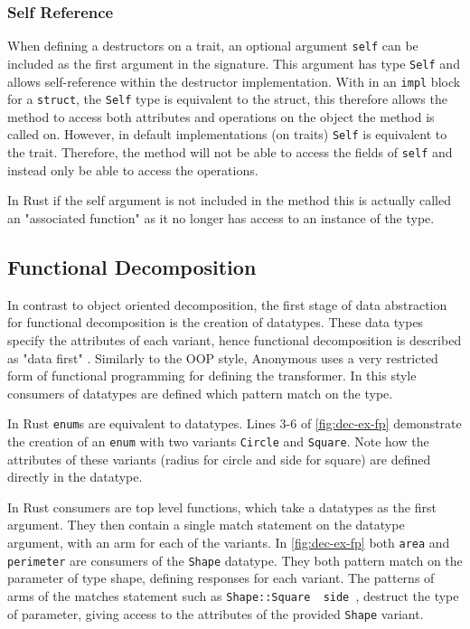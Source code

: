 \documentclass[ oneside,%
                    author={James Elgar},
                    degree={MEng},
                     title={Bidirectional transformer between functional and \\ object-oriented programming in Rust},
                  subtitle={}]{dissertation}
\newcommand{\weixin}{Anonymous }
\newcommand{\rust}[1]{\texttt{#1}}
\begin{document}
\subsubsection{Self Reference}

When defining a destructors on a trait, an optional argument \rust{self} can be included as the first argument in the signature. 
This argument has type \rust{Self} and allows self-reference within the destructor implementation.
With in an \rust{impl} block for a \rust{struct}, the \rust{Self} type is equivalent to the struct, this therefore allows the method to access both attributes and operations on the object the method is called on.
However, in default implementations (on traits) \rust{Self} is equivalent to the trait. Therefore, the method will not be able to access the fields of \rust{self} and instead only be able to access the operations.  

In Rust if the self argument is not included in the method this is actually called an "associated function" as it no longer has access to an instance of the type.


\subsection{Functional Decomposition}

In contrast to object oriented decomposition, the first stage of data abstraction for functional decomposition is the creation of datatypes.
These data types specify the attributes of each variant, hence functional decomposition is described as "data first" \cite{food}. 
Similarly to the OOP style, \weixin uses a very restricted form of functional programming for defining the transformer.  
In this style consumers of datatypes are defined which pattern match on the type.

In Rust \rust{enum}s are equivalent to datatypes. Lines 3-6 of \autoref{fig:dec-ex-fp} demonstrate the creation of an \rust{enum} with two variants \rust{Circle} and \rust{Square}. Note how the attributes of these variants (radius for circle and side for square) are defined directly in the datatype.

In Rust consumers are top level functions, which take a datatypes as the first argument. They then contain a single match statement on the datatype argument, with an arm for each of the variants. In \autoref{fig:dec-ex-fp} both \rust{area} and \rust{perimeter} are consumers of the \rust{Shape} datatype. 
They both pattern match on the parameter of type shape, defining responses for each variant. The patterns of arms of the matches statement such as \rust{Shape::Square { side }}, destruct the type of parameter, giving access to the attributes of the provided \rust{Shape} variant. 
\end{document}
